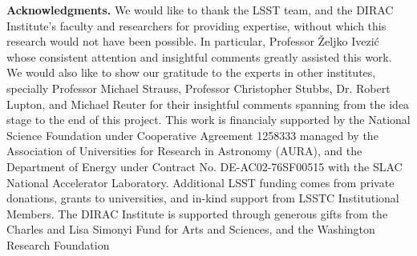 \documentclass[12pt]{aastex62}
\theoremstyle{definition}
\begin{document}
\acknowledgments
\textbf{Acknowledgments.} We would like to thank the LSST team, and the DIRAC Institute's faculty and researchers for providing expertise, without which this research would not have been possible. In particular, Professor \v{Z}eljko Ivezi\'{c} whose consistent attention and insightful comments greatly assisted this work. We would also like to show our gratitude to the experts in other institutes, specially Professor Michael Strauss, Professor Christopher Stubbs, Dr. Robert Lupton, and Michael Reuter for their insightful comments spanning from the idea stage to the end of this project. This work is financialy supported by the National Science Foundation under Cooperative Agreement 1258333 managed by the Association of Universities for Research in Astronomy (AURA), and the Department of Energy under Contract No. DE-AC02-76SF00515 with the SLAC National Accelerator Laboratory. Additional LSST funding comes from private donations, grants to universities, and in-kind support from LSSTC Institutional Members. The DIRAC Institute is supported through generous gifts from the Charles and Lisa Simonyi Fund for Arts and Sciences, and the Washington Research Foundation



%
%

\end{document}
